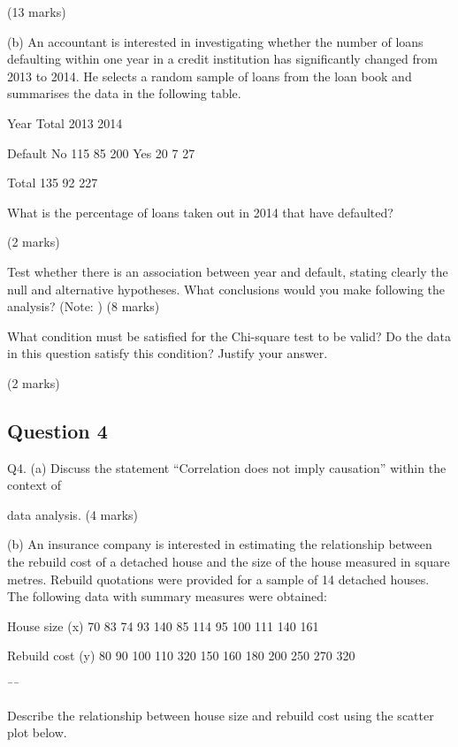 (13 marks)

(b) An accountant is interested in investigating whether the number of loans defaulting within one year in a credit institution has significantly changed from 2013 to 2014. He selects a random sample of loans from the loan book and summarises the data in the following table.

Year Total 2013 2014

Default No 115 85 200 Yes 20 7 27

Total 135 92 227

\item[(i)] What is the percentage of loans taken out in 2014 that have defaulted?

(2 marks)

\item[(ii)] Test whether there is an association between year and default, stating clearly the null and alternative hypotheses. What conclusions would you make following the analysis? (Note: ) (8 marks)

\item[(iii)] What condition must be satisfied for the Chi-square test to be valid? Do the data in this question satisfy this condition? Justify your answer.

(2 marks)

\newpage
\subsection*{Question 4}


Q4. (a) Discuss the statement “Correlation does not imply causation” within the context of

data analysis. (4 marks)

(b) An insurance company is interested in estimating the relationship between the rebuild cost of a detached house and the size of the house measured in square metres. Rebuild quotations were provided for a sample of 14 detached houses. The following data with summary measures were obtained:

House size (x) 70 83 74 93 140 85 114 95 100 111 140 161

Rebuild cost (y) 80 90 100 110 320 150 160 180 200 250 270 320

¯¯

\item[(i)] Describe the relationship between house size and rebuild cost using the scatter plot below.

